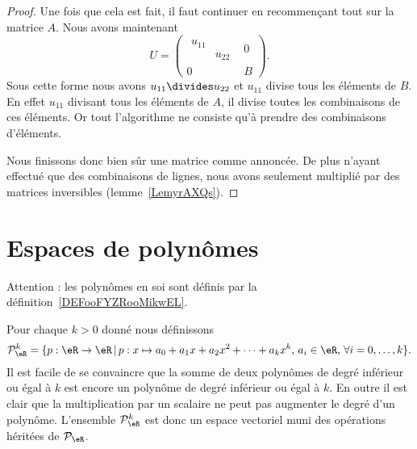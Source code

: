 \begin{proof}
    Une fois que cela est fait, il faut continuer en recommençant tout sur la matrice \( A\). Nous avons maintenant
    \begin{equation}
        U=\begin{pmatrix}
            \begin{matrix}
                u_{11}  &       \\
                &   u_{22}
            \end{matrix}&   0    \\
            0    &   B
        \end{pmatrix}.
    \end{equation}
    Sous cette forme nous avons \( u_{11}\divides u_{22}\) et \( u_{11}\) divise tous les éléments de \( B\). En effet \( u_{11}\) divisant tous les éléments de \( A\), il divise toutes les combinaisons de ces éléments. Or tout l'algorithme ne consiste qu'à prendre des combinaisons d'éléments.

    Nous finissons donc bien sûr une matrice comme annoncée. De plus n'ayant effectué que des combinaisons de lignes, nous avons seulement multiplié par des matrices inversibles (lemme~\ref{LemyrAXQs}).
\end{proof}



\section{Espaces de polynômes}
\label{SecEspacePolynomes}

Attention : les polynômes en soi sont définis par la définition~\ref{DEFooFYZRooMikwEL}.

Pour chaque $k>0$ donné nous définissons
\begin{equation}
\mathcal{P}_\eR^k=\{p:\eR\to \eR\,|\, p : x\mapsto a_0+a_1 x +a_2 x^2 + \cdots+a_k x^k, \, a_i\in\eR,\,\forall i=0,\ldots,k\}.
\end{equation}
Il est facile de se convaincre que la somme de deux polynômes de degré inférieur ou égal à $k$ est encore un polynôme de degré inférieur ou égal à $k$. En outre il est clair que la multiplication par un scalaire ne peut pas augmenter le degré d'un polynôme. L'ensemble $\mathcal{P}_\eR^k$ est donc un espace vectoriel muni des opérations héritées de $\mathcal{P}_{\eR}$.

